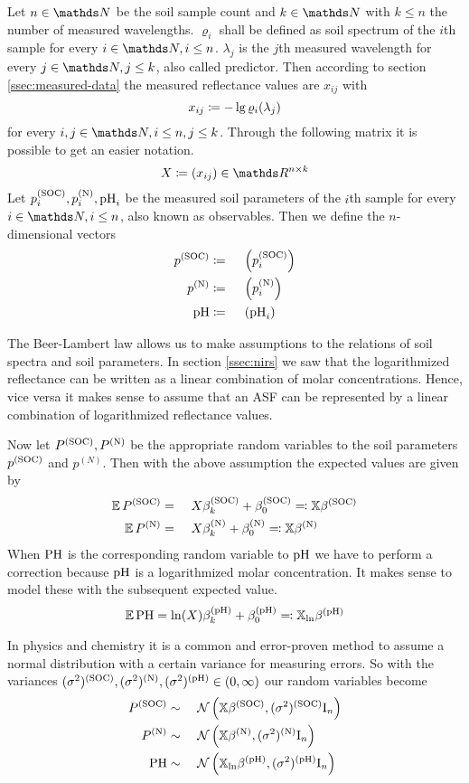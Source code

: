 		Let $n\in\SN$ be the soil sample count and $k\in\SN$ with $k\leq n$ the number of measured wavelengths.
		$\varrho_i$ shall be defined as soil spectrum of the $i$th sample for every $i\in\SN,i\leq n$.
		$\lambda_j$ is the $j$th measured wavelength for every $j\in\SN,j\leq k$, also called predictor.
		Then according to section \ref{ssec:measured-data} the measured reflectance values are $x_{ij}$ with
		\[
			x_{ij} \coloneqq -\lg \varrho_i(\lambda_j)
		\]
		for every $i,j\in\SN,i\leq n,j\leq k$.
		Through the following matrix it is possible to get an easier notation.
		\[
			X \define (x_{ij}) \in \SR^{n\times k}
		\]
		Let $p^{\mathrm{(SOC)}}_i, p^{\mathrm{(N)}}_i, \mathrm{pH}_i$ be the measured soil parameters of the $i$th sample for every $i\in\SN,i\leq n$, also known as observables.
		Then we define the $n$-dimensional vectors
		\begin{alignat*}{3}
			p^{\mathrm{(SOC)}} &\coloneqq&&\ \left( p^{\mathrm{(SOC)}}_i \right) \\
			p^{\mathrm{(N)}} &\coloneqq&&\ \left( p^{\mathrm{(N)}}_i \right) \\
			\mathrm{pH} &\coloneqq&&\ \left( \mathrm{pH}_i \right)
		\end{alignat*}

		The Beer-Lambert law allows us to make assumptions to the relations of soil spectra and soil parameters.
		In section \ref{ssec:nirs} we saw that the logarithmized reflectance can be written as a linear combination of molar concentrations.
		Hence, vice versa it makes sense to assume that an ASF can be represented by a linear combination of logarithmized reflectance values.

		Now let $P^{\mathrm{(SOC)}},P^{\mathrm{(N)}}$ be the appropriate random variables to the soil parameters $p^{\mathrm{(SOC)}}$ and $p^{(N)}$.
		Then with the above assumption the expected values are given by
		\begin{alignat*}{3}
			\operatorname{\mathbb{E}} P^{\mathrm{(SOC)}} &=&&\ X\beta^{\mathrm{(SOC)}}_k + \beta^{\mathrm{(SOC)}}_0 \eqqcolon \mathbb{X}\beta^{\mathrm{(SOC)}} \\
			\operatorname{\mathbb{E}} P^{\mathrm{(N)}} &=&&\ X\beta^{\mathrm{(N)}}_k + \beta^{\mathrm{(N)}}_0 \eqqcolon \mathbb{X}\beta^{\mathrm{(N)}}
		\end{alignat*}
		When $\mathrm{PH}$ is the corresponding random variable to $\mathrm{pH}$ we have to perform a correction because $\mathrm{pH}$ is a logarithmized molar concentration.
		It makes sense to model these with the subsequent expected value.
		\[
			\operatorname{\mathbb{E}} \mathrm{PH} = \ln(X)\beta^{\mathrm{(pH)}}_k + \beta^{\mathrm{(pH)}}_0 \eqqcolon \mathbb{X}_{\ln}\beta^{\mathrm{(pH)}}
		\]

		In physics and chemistry it is a common and error-proven method to assume a normal distribution with a certain variance for measuring errors.
		So with the variances $(\sigma^2)^{\mathrm{(SOC)}},(\sigma^2)^{\mathrm{(N)}},(\sigma^2)^{\mathrm{(pH)}}\in(0,\infty)$ our random variables become
		\begin{alignat*}{3}
			P^\m{(SOC)} &\sim&&\ \FN\curvb{\mathbb{X}\beta^\m{(SOC)}, (\sigma^2)^\m{(SOC)}\idmat_n} \\
			P^\m{(N)} &\sim&&\ \FN\curvb{\mathbb{X}\beta^\m{(N)}, (\sigma^2)^\m{(N)}\idmat_n} \\
			\m{PH} &\sim&&\ \FN\curvb{\mathbb{X}_{\ln}\beta^\m{(pH)}, (\sigma^2)^\m{(pH)}\idmat_n}
		\end{alignat*}
	
